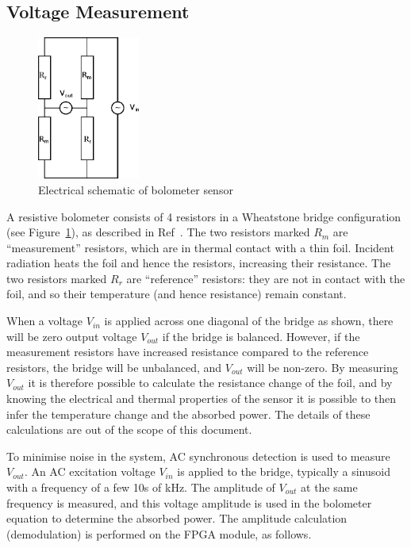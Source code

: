 \documentclass[12pt,a4paper]{article}
\begin{document}
\subsection{Voltage Measurement}
\label{sec:voltage}
\begin{figure}
  \centering
  \includegraphics[width=0.3\textwidth]{sensor_schematic.eps}
  \caption{Electrical schematic of bolometer sensor\label{fig:sensor}}
\end{figure}
A resistive bolometer consists of 4 resistors in a Wheatstone bridge configuration (see Figure~\ref{fig:sensor}), as described in Ref~\cite{mast-1991}.
The two resistors marked $R_m$ are ``measurement'' resistors, which are in thermal contact with a thin foil. Incident radiation heats the foil and hence
the resistors, increasing their resistance. The two resistors marked $R_r$ are ``reference'' resistors: they are not in contact with the foil, and so their
temperature (and hence resistance) remain constant.

When a voltage $V_{in}$ is applied across one diagonal of the bridge as shown, there will be zero output voltage $V_{out}$ if the bridge is balanced.
However, if the measurement resistors have increased resistance compared to the reference resistors, the bridge will be unbalanced, and $V_{out}$ will be
non-zero. By measuring $V_{out}$ it is therefore possible to calculate the resistance change of the foil, and by knowing the electrical and thermal
properties of the sensor it is possible to then infer the temperature change and the absorbed power. The details of these calculations are out of the
scope of this document.

To minimise noise in the system, AC synchronous detection is used to measure $V_{out}$. An AC excitation voltage $V_{in}$ is applied to the bridge,
typically a sinusoid with a frequency of a few 10s of kHz. The amplitude of $V_{out}$ at the same frequency is measured, and this voltage amplitude is
used in the bolometer equation to determine the absorbed power. The amplitude calculation (demodulation) is performed on the FPGA module, as follows.
\end{document}
